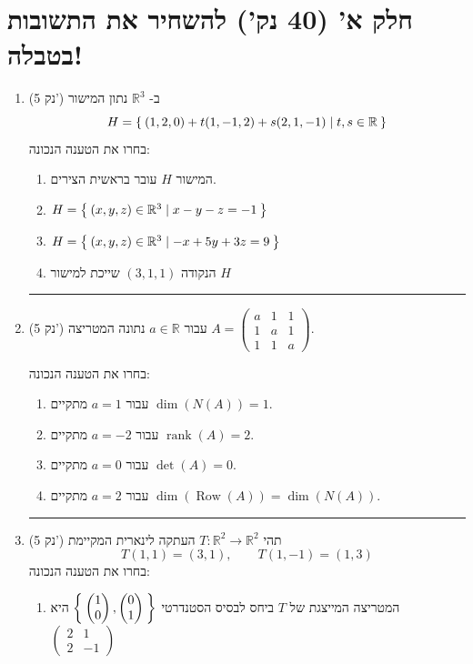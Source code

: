 \documentclass[12pt, a4paper]{article}
\newcommand{\rr}{\mathbb{R}}
\DeclareMathOperator{\rank}{rank}
\newcommand{\points}[1]{(#1 נק') }
\DeclareMathOperator{\row}{Row}
\begin{document}
\section*{
חלק א' 
(40 נק')
להשחיר את התשובות בטבלה!}
\begin{enumerate}
\item\points{5}
ב-
$\rr^3$
נתון המישור
$$H=\Set{(1,2,0)+t(1,-1,2)+s(2,1,-1) \mid t,s\in \rr}$$
בחרו את הטענה הנכונה:
\begin{enumerate}
\item
המישור
$H$
עובר בראשית הצירים.

\item
$H = \Set{(x,y,z)\in \rr^3\mid x-y-z=-1}$

\item
$H=\Set{(x,y,z)\in \rr^3\mid-x+5y+3z=9}$

\item
הנקודה
$(3,1,1)$
שייכת למישור
$H$
\end{enumerate}

\noindent\rule{\textwidth-30pt}{0.4pt}


\item\points{5}
עבור
$a\in\rr$
נתונה המטריצה
$A=
\begin{pmatrix}
a&1&1\\
1&a&1\\
1&1&a
\end{pmatrix}$.

בחרו את הטענה הנכונה:
\begin{enumerate}
\item
עבור
$a=1$
מתקיים
$\dim(N(A))=1$.

\item
עבור
$a=-2$
מתקיים
$\rank(A)=2$.

\item
עבור
$a=0$
מתקיים
$\det(A)=0$.

\item
עבור
$a=2$
מתקיים
$\dim(\row(A))=\dim(N(A))$.
\end{enumerate}

\noindent\rule{\textwidth-30pt}{0.4pt}

\item\points{5}
תהי
$T:\rr^2\to\rr^2$
העתקה לינארית המקיימת
$$T(1,1)=(3,1),\qquad T(1,-1)=(1,3)$$
בחרו את הטענה הנכונה:
\begin{enumerate}
\item
המטריצה המייצגת של
$T$
ביחס לבסיס הסטנדרטי 
$\Set{\begin{pmatrix}
    1 \\ 0
\end{pmatrix},
\begin{pmatrix}
    0 \\ 1
\end{pmatrix}
}$
היא
$\begin{pmatrix}
2&1\\
2&-1
\end{pmatrix}$


\end{enumerate}
\end{enumerate}
\end{document}
